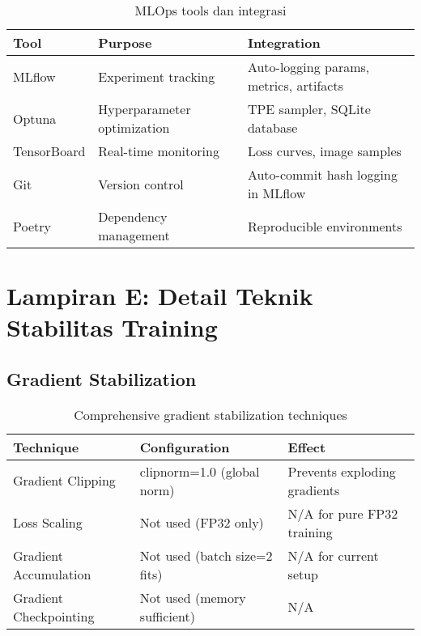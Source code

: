 \documentclass[12pt,a4paper]{article}
\begin{document}
\begin{table}[H]
\centering
\caption{MLOps tools dan integrasi}
\label{tab:appendix-mlops}
\small
\begin{tabular}{|l|l|p{7cm}|}
\hline
\textbf{Tool} & \textbf{Purpose} & \textbf{Integration} \\ \hline
MLflow & Experiment tracking & Auto-logging params, metrics, artifacts \\ \hline
Optuna & Hyperparameter optimization & TPE sampler, SQLite database \\ \hline
TensorBoard & Real-time monitoring & Loss curves, image samples \\ \hline
Git & Version control & Auto-commit hash logging in MLflow \\ \hline
Poetry & Dependency management & Reproducible environments \\ \hline
\end{tabular}
\end{table}


\section{Lampiran E: Detail Teknik Stabilitas Training}
\label{appendix:stability-techniques}

\subsection{Gradient Stabilization}

\begin{table}[H]
\centering
\caption{Comprehensive gradient stabilization techniques}
\label{tab:appendix-gradient-stability}
\small
\begin{tabular}{|l|l|p{6.5cm}|}
\hline
\textbf{Technique} & \textbf{Configuration} & \textbf{Effect} \\ \hline
Gradient Clipping & clipnorm=1.0 (global norm) & Prevents exploding gradients \\ \hline
Loss Scaling & Not used (FP32 only) & N/A for pure FP32 training \\ \hline
Gradient Accumulation & Not used (batch size=2 fits) & N/A for current setup \\ \hline
Gradient Checkpointing & Not used (memory sufficient) & N/A \\ \hline
\end{tabular}
\end{table}
\end{document}
